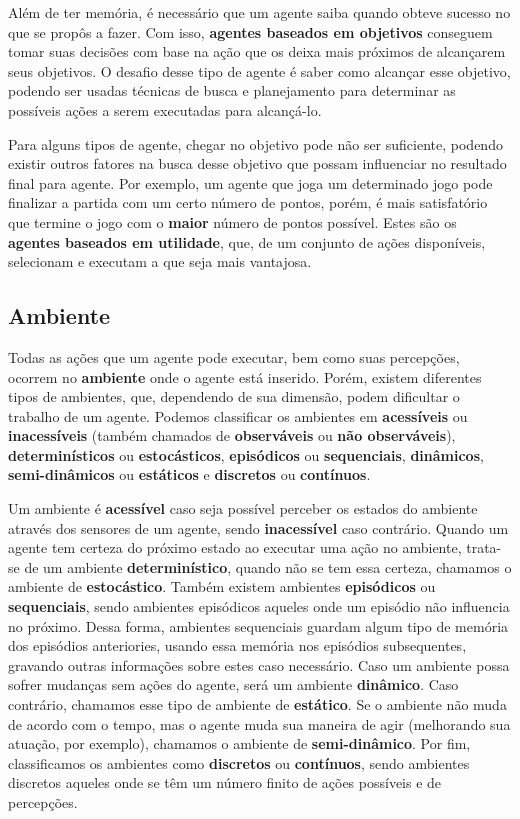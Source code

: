 Além de ter memória, é necessário que um agente saiba quando obteve sucesso no
que se propôs a fazer. Com isso, \textbf{agentes baseados em objetivos}
conseguem tomar suas decisões com base na ação que os deixa mais próximos de
alcançarem seus objetivos. O desafio desse tipo de agente é saber como alcançar
esse objetivo, podendo ser usadas técnicas de busca e planejamento para
determinar as possíveis ações a serem executadas para alcançá-lo.

Para alguns tipos de agente, chegar no objetivo pode não ser suficiente,
podendo existir outros fatores na busca desse objetivo que possam influenciar
no resultado final para agente. Por exemplo, um agente que joga um determinado
jogo pode finalizar a partida com um certo número de pontos, porém, é mais
satisfatório que termine o jogo com o \textbf{maior} número de pontos
possível. Estes são os \textbf{agentes baseados em utilidade}, que, de um
conjunto de ações disponíveis, selecionam e executam a que seja mais vantajosa.

\subsection{Ambiente}
Todas as ações que um agente pode executar, bem como suas percepções, ocorrem
no \textbf{ambiente} onde o agente está inserido. Porém, existem diferentes
tipos de ambientes, que, dependendo de sua dimensão, podem dificultar o trabalho
de um agente. Podemos classificar os ambientes em \textbf{acessíveis} ou
\textbf{inacessíveis} (também chamados de \textbf{observáveis} ou \textbf{não
observáveis}), \textbf{determinísticos} ou \textbf{estocásticos},
\textbf{episódicos} ou \textbf{sequenciais}, \textbf{dinâmicos},
\textbf{semi-dinâmicos} ou \textbf{estáticos} e \textbf{discretos} ou
\textbf{contínuos}.

Um ambiente é \textbf{acessível} caso seja possível perceber os estados do
ambiente através dos sensores de um agente, sendo \textbf{inacessível} caso
contrário. Quando um agente tem certeza do próximo estado ao executar uma ação
no ambiente, trata-se de um ambiente \textbf{determinístico}, quando não se tem
essa certeza, chamamos o ambiente de \textbf{estocástico}. Também existem
ambientes \textbf{episódicos} ou \textbf{sequenciais}, sendo ambientes
episódicos aqueles onde um episódio não influencia no próximo. Dessa forma,
ambientes sequenciais guardam algum tipo de memória dos episódios anteriories,
usando essa memória nos episódios subsequentes, gravando outras informações
sobre estes caso necessário. Caso um ambiente possa sofrer mudanças sem ações
do agente, será um ambiente \textbf{dinâmico}. Caso contrário, chamamos esse
tipo de ambiente de \textbf{estático}. Se o ambiente não muda de acordo com o
tempo, mas o agente muda sua maneira de agir (melhorando sua atuação, por
exemplo), chamamos o ambiente de \textbf{semi-dinâmico}. Por fim, classificamos
os ambientes como \textbf{discretos} ou \textbf{contínuos}, sendo ambientes
discretos aqueles onde se têm um número finito de ações possíveis e de
percepções.

